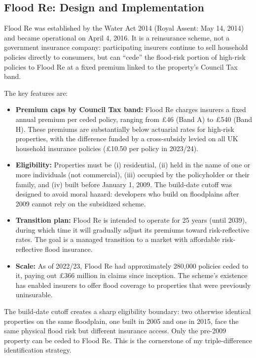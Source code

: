 \documentclass[12pt]{article}
\begin{document}
\subsection{Flood Re: Design and Implementation}

Flood Re was established by the Water Act 2014 (Royal Assent: May 14, 2014) and became operational on April 4, 2016. It is a reinsurance scheme, not a government insurance company: participating insurers continue to sell household policies directly to consumers, but can ``cede'' the flood-risk portion of high-risk policies to Flood Re at a fixed premium linked to the property's Council Tax band.

The key features are:

\begin{itemize}
\item \textbf{Premium caps by Council Tax band:} Flood Re charges insurers a fixed annual premium per ceded policy, ranging from \pounds46 (Band A) to \pounds540 (Band H). These premiums are substantially below actuarial rates for high-risk properties, with the difference funded by a cross-subsidy levied on all UK household insurance policies (\pounds10.50 per policy in 2023/24).

\item \textbf{Eligibility:} Properties must be (i) residential, (ii) held in the name of one or more individuals (not commercial), (iii) occupied by the policyholder or their family, and (iv) built before January 1, 2009. The build-date cutoff was designed to avoid moral hazard: developers who build on floodplains after 2009 cannot rely on the subsidized scheme.

\item \textbf{Transition plan:} Flood Re is intended to operate for 25 years (until 2039), during which time it will gradually adjust its premiums toward risk-reflective rates. The goal is a managed transition to a market with affordable risk-reflective flood insurance.

\item \textbf{Scale:} As of 2022/23, Flood Re had approximately 280,000 policies ceded to it, paying out \pounds366 million in claims since inception. The scheme's existence has enabled insurers to offer flood coverage to properties that were previously uninsurable.
\end{itemize}

The build-date cutoff creates a sharp eligibility boundary: two otherwise identical properties on the same floodplain, one built in 2005 and one in 2015, face the same physical flood risk but different insurance access. Only the pre-2009 property can be ceded to Flood Re. This is the cornerstone of my triple-difference identification strategy.
\end{document}
